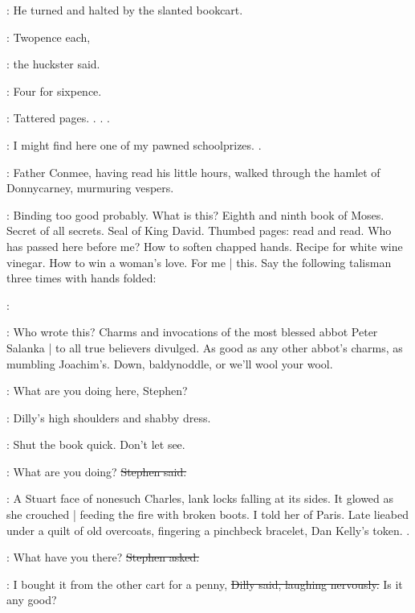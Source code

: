 :
He turned and halted by the slanted bookcart.

\huckster:
Twopence each,

:
the huckster said.

\huckster:
Four for sixpence.

\StephenInt:
Tattered pages.
.
.
.

\StephenInt:
I might find here one of my pawned schoolprizes.%
.

\begin{interject}
    :
    Father Conmee, having read his little hours,
    walked through the hamlet of Donnycarney,
    murmuring vespers.
\end{interject}

\StephenInt:
Binding too good probably.
What is this?
Eighth and ninth book of Moses.
Secret of all secrets.
Seal of King David.
Thumbed pages: read and read.
Who has passed here before me?
How to soften chapped hands.
Recipe for white wine vinegar.
How to win a woman's love.
For me |
this.
Say the following talisman three times with hands folded:

\StephenInt:


\StephenInt:
Who wrote this?%
Charms and invocations of the most blessed abbot Peter Salanka |
to all true believers divulged.
As good as any other abbot's charms,
as mumbling Joachim's.
Down, baldynoddle, or we'll wool your wool.

\dilly:
What are you doing here, Stephen?

\StephenInt:
Dilly's high shoulders and shabby dress.

\StephenInt:
Shut the book quick.
Don't let see.

\Stephen:
What are you doing?
\sout{Stephen said.}

\StephenInt:
A Stuart face of nonesuch Charles,
lank locks falling at its sides.
It glowed as she crouched |
feeding the fire with broken boots.
I told her of Paris.%
Late lieabed under a quilt of old overcoats,
fingering a pinchbeck bracelet,
Dan Kelly's token.
.

\Stephen:
What have you there?
\sout{Stephen asked.}

\dilly:
I bought it from the other cart for a penny,
\sout{Dilly said, laughing nervously.}
Is it any good?

